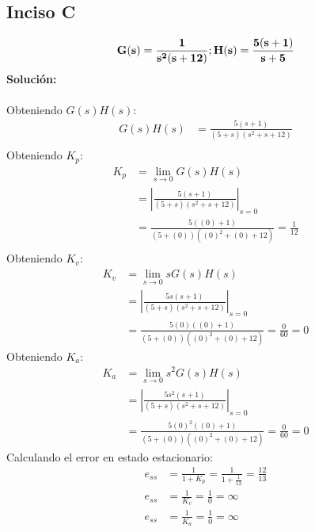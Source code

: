 \documentclass[11pt, twoside]{article}
\begin{document}
\subsection{Inciso C}
\begin{equation*}
    \mathbf{G(s)=\frac{1}{s^{2}(s+12)};\space H(s)=\frac{5(s+1)}{s+5}}
\end{equation*}
\textbf{Solución:}\\\\
Obteniendo $G(s)H(s)$:
\begin{align*}
    G(s)H(s) & = \frac{5(s+1)}{(5+s)(s^{2}+s+12)} \\
\end{align*}
Obteniendo $K_{p}$:
\begin{align*}
    K_{p} & = \lim_{s\to 0}{G(s)H(s)}                              \\
          & = \left|\frac{5(s+1)}{(5+s)(s^{2}+s+12)}\right|_{s=0}      \\
          & = \frac{5((0)+1)}{(5+(0))((0)^{2}+(0)+12)} = \boxed{\frac{1}{12}} \\
\end{align*}
Obteniendo $K_{v}$:
\begin{align*}
    K_{v} & = \lim_{s\to 0}{sG(s)H(s)}                \\
          & = \left|\frac{5s(s+1)}{(5+s)(s^{2}+s+12)}\right|_{s=0}       \\
          & = \frac{5(0)((0)+1)}{(5+(0))((0)^{2}+(0)+12)} = \frac{0}{60} = \boxed{0}
\end{align*}
Obteniendo $K_{a}$:
\begin{align*}
    K_{a} & = \lim_{s\to0}{s^{2}G(s)H(s)}                    \\
          & = \left|\frac{5s^{2}(s+1)}{(5+s)(s^{2}+s+12)}\right|_{s=0}             \\
          & = \frac{5(0)^{2}((0)+1)}{(5+(0))((0)^{2}+(0)+12)} = \frac{0}{60} = \boxed{0}
\end{align*}
\newpage
Calculando el error en estado estacionario:
\begin{align*}
    e_{ss} & = \frac{1}{1+K_{p}} = \frac{1}{1+\frac{1}{12}} = \boxed{\frac{12}{13}}              \\
    e_{ss} & = \frac{1}{K_{v}} = \frac{1}{0} = \boxed{\infty} \\
    e_{ss} & = \frac{1}{K_{a}} = \frac{1}{0} = \boxed{\infty}
\end{align*}
\end{document}
